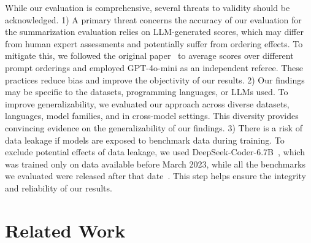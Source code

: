 \documentclass[10pt,conference]{IEEEtran}
\newcommand{\todoc}[2]{{\textcolor{#1}{\textbf{[#2]}}}}
\newcommand{\shi}[1]{\todoc{orange}{Shi: #1}}
\begin{document}
While our evaluation is comprehensive, several threats to validity should be acknowledged. 1) A primary threat concerns the accuracy of our evaluation for the summarization evaluation relies on LLM-generated scores, which may differ from human expert assessments and potentially suffer from ordering effects. To mitigate this, we followed the original paper~\cite{bogomolov2024long} to average scores over different prompt orderings and employed GPT-4o-mini as an independent referee. These practices reduce bias and improve the objectivity of our results.
2) Our findings may be specific to the datasets, programming languages, or LLMs used. To improve generalizability, we evaluated our approach across diverse datasets, languages, model families, and in cross-model settings. This diversity provides convincing evidence on the generalizability of our findings.
3) There is a risk of data leakage if models are exposed to benchmark data during training. To exclude potential effects of data leakage,  we used DeepSeek-Coder-6.7B~\cite{guo2024deepseek}, which was trained only on data available before March 2023, while all the benchmarks we evaluated were released after that date~\cite{guo2023longcoder, bogomolov2024long, liu2024repoqa}. This step helps ensure the integrity and reliability of our results.

\section{Related Work}
\end{document}
